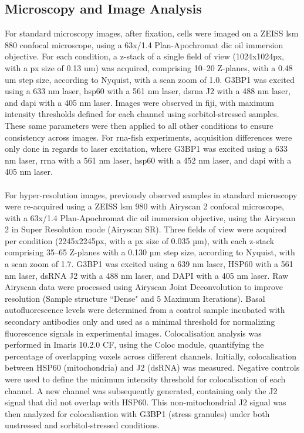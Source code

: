 \subsection{Microscopy and Image Analysis}

For standard microscopy images, after fixation, cells were imaged on a ZEISS \gls{lsm} 880 confocal microscope, using a 63x/1.4 Plan-Apochromat \gls{dic} oil immersion objective. For each condition, a z-stack of a single field of view (1024x1024\gls{px}, with a \gls{px} size of 0.13 \gls{um}) was acquired, comprising 10–20 Z-planes, with a 0.48 \gls{um} step size, according to Nyquist, with a scan zoom of 1.0. G3BP1 was excited using a 633 \gls{nm} laser, \gls{hsp60} with a 561 \gls{nm} laser, \gls{dsrna} J2 with a 488 \gls{nm} laser, and \gls{dapi} with a 405 \gls{nm} laser. Images were observed in \gls{fiji}, with maximum intensity thresholds defined for each channel using sorbitol-stressed samples. These same parameters were then applied to all other conditions to ensure consistency across images. For \gls{rna}-\gls{fish} experiments, acquisition differences were only done in regards to laser excitation, where G3BP1 was excited using a 633 \gls{nm} laser, \gls{rrna} with a 561 \gls{nm} laser, \gls{hsp60} with a 452 \gls{nm} laser, and \gls{dapi} with a 405 \gls{nm} laser.
\\
\\
For hyper-resolution images, previously observed samples in standard microscopy were re-acquired using a ZEISS \gls{lsm} 980 with Airyscan 2 confocal microscope, with a 63x/1.4 Plan-Apochromat \gls{dic} oil immersion objective, using the Airyscan 2 in Super Resolution mode (Airyscan SR). Three fields of view were acquired per condition (2245x2245px, with a px size of 0.035 µm), with each z-stack comprising 35–65 Z-planes with a 0.130 µm step size, according to Nyquist, with a scan zoom of 1.7. G3BP1 was excited using a 639 nm laser, HSP60 with a 561 nm laser, dsRNA J2 with a 488 nm laser, and DAPI with a 405 nm laser.  Raw Airyscan data were processed using Airyscan Joint Deconvolution to improve resolution (Sample structure ``Dense" and 5 Maximum Iterations). Basal autofluorescence levels were determined from a control sample incubated with secondary antibodies only and used as a minimal threshold for normalizing fluorescence signals in experimental images.
Colocalisation analysis was performed in Imaris 10.2.0 CF, using the Coloc module, quantifying the percentage of overlapping voxels across different channels. Initially, colocalisation between HSP60 (mitochondria) and J2 (dsRNA) was measured. Negative controls were used to define the minimum intensity threshold for colocalisation of each channel. A new channel was subsequently generated, containing only the J2 signal that did not overlap with HSP60. This non-mitochondrial J2 signal was then analyzed for colocalisation with G3BP1 (stress granules) under both unstressed and sorbitol-stressed conditions.
